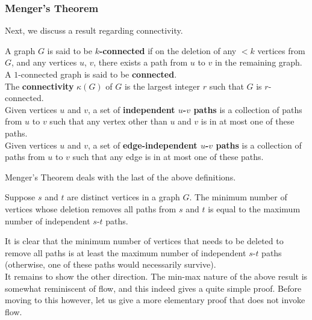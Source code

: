 		\subsubsection{Menger's Theorem}

			Next, we discuss a result regarding connectivity.

			\begin{fdef}
				A graph $G$ is said to be \textbf{$k$-connected} if on the deletion of any $<k$ vertices from $G$, and any vertices $u$, $v$, there exists a path from $u$ to $v$ in the remaining graph.
				A $1$-connected graph is said to be \textbf{connected}. \\
				The \textbf{connectivity} $\kappa(G)$ of $G$ is the largest integer $r$ such that $G$ is $r$-connected.\\
				Given vertices $u$ and $v$, a set of \textbf{independent $u$-$v$ paths} is a collection of paths from $u$ to $v$ such that any vertex other than $u$ and $v$ is in at most one of these paths.\\
				Given vertices $u$ and $v$, a set of \textbf{edge-independent $u$-$v$ paths} is a collection of paths from $u$ to $v$ such that any edge is in at most one of these paths.
			\end{fdef}

			Menger's Theorem deals with the last of the above definitions.

			\begin{ftheo}
				Suppose $s$ and $t$ are distinct vertices in a graph $G$. The minimum number of vertices whose deletion removes all paths from $s$ and $t$ is equal to the maximum number of independent $s$-$t$ paths.
			\end{ftheo}

			It is clear that the minimum number of vertices that needs to be deleted to remove all paths is at least the maximum number of independent $s$-$t$ paths (otherwise, one of these paths would necessarily survive).\\
			It remains to show the other direction.
			The min-max nature of the above result is somewhat reminiscent of flow, and this indeed gives a quite simple proof. Before moving to this however, let us give a more elementary proof that does not invoke flow.

